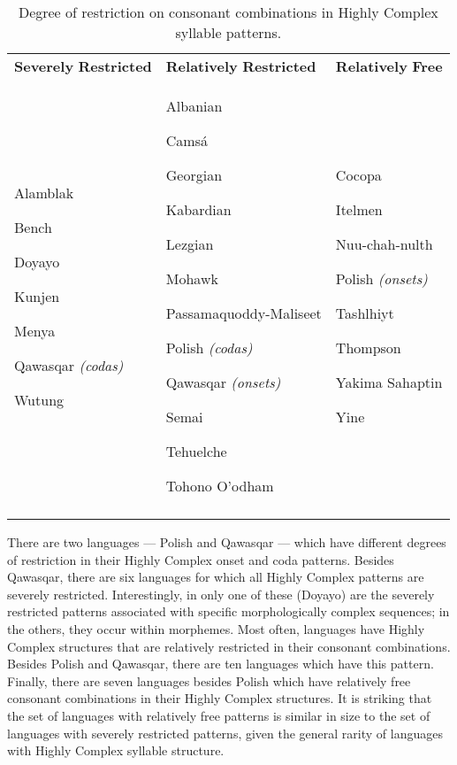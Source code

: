 \begin{table}
\begin{tabularx}{\textwidth}{XXX}
\lsptoprule

\textbf{Severely} \textbf{Restricted} & \textbf{Relatively} \textbf{Restricted}  & \textbf{Relatively} \textbf{Free}\\
Alamblak

Bench

Doyayo

Kunjen

Menya

Qawasqar \textit{(codas)}

Wutung & Albanian

Camsá

Georgian

Kabardian

Lezgian

Mohawk

Passamaquoddy-Maliseet

Polish \textit{(codas)}

Qawasqar \textit{(onsets)}

Semai

Tehuelche

Tohono O’odham & Cocopa

Itelmen

Nuu-chah-nulth

Polish \textit{(onsets)}

Tashlhiyt

Thompson

Yakima Sahaptin

Yine\\
\lspbottomrule
\end{tabularx}
\caption{\label{3.13}Degree of restriction on consonant combinations in Highly Complex syllable patterns.}
\end{table}




  There are two languages — Polish and Qawasqar — which have different degrees of restriction in their Highly Complex onset and coda patterns. Besides Qawasqar, there are six languages for which all Highly Complex patterns are severely restricted. Interestingly, in only one of these (Doyayo) are the severely restricted patterns associated with specific morphologically complex sequences; in the others, they occur within morphemes. Most often, languages have Highly Complex structures that are relatively restricted in their consonant combinations. Besides Polish and Qawasqar, there are ten languages which have this pattern. Finally, there are seven languages besides Polish which have relatively free consonant combinations in their Highly Complex structures. It is striking that the set of languages with relatively free patterns is similar in size to the set of languages with severely restricted patterns, given the general rarity of languages with Highly Complex syllable structure.



